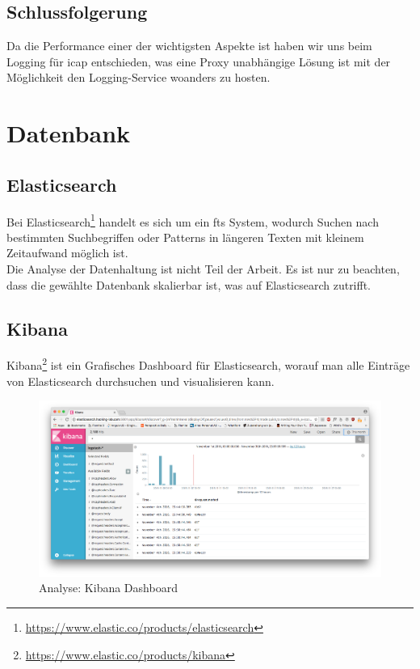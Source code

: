 \subsection{Schlussfolgerung}
Da die Performance einer der wichtigsten Aspekte ist haben wir uns beim Logging für \gls{icap} entschieden, was eine Proxy unabhängige Lösung ist mit der Möglichkeit den Logging-Service woanders zu hosten.


\section{Datenbank}
\label{analyse:database}
\subsection{Elasticsearch}
Bei Elasticsearch\cite{elastic:elasticsearch}\footnote{\url{https://www.elastic.co/products/elasticsearch}} handelt es sich um ein \ac{fts} System, wodurch Suchen nach bestimmten Suchbegriffen oder Patterns in längeren Texten mit kleinem Zeitaufwand möglich ist.\\

Die Analyse der Datenhaltung ist nicht Teil der Arbeit. Es ist nur zu beachten, dass die gewählte Datenbank skalierbar ist, was auf Elasticsearch zutrifft.

\subsection{Kibana}
Kibana\cite{elastic:kibana}\footnote{\url{https://www.elastic.co/products/kibana}} ist ein Grafisches Dashboard für Elasticsearch, worauf man alle Einträge von Elasticsearch durchsuchen und visualisieren kann.

\begin{figure}[H]
	\centering
	\includegraphics[width=\textwidth]{img/kibana}
	\caption{Analyse: Kibana Dashboard}
	\label{fig:kibana-dashboard}
\end{figure}

